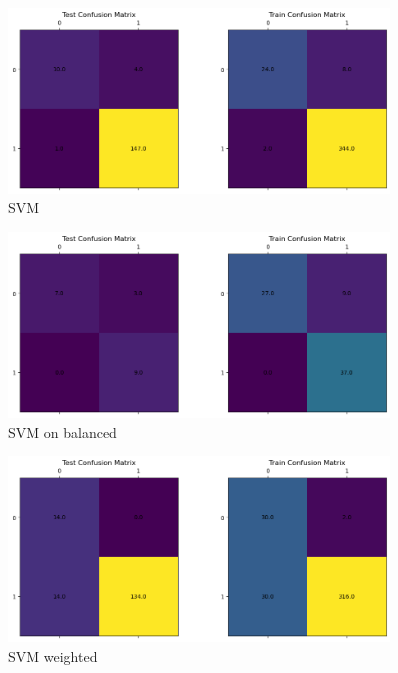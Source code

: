 \documentclass[12pt]{article}
\begin{document}
        \newpage


        \begin{figure}[h!]
            \centering
            \includegraphics[width=0.9\textwidth]{resources/conf_svm.png}
            \caption{SVM}
            \label{fig:conf_svm}
        \end{figure}


        \begin{figure}[h!]
            \centering
            \includegraphics[width=0.9\textwidth]{resources/conf_svm_balanced.png}
            \caption{SVM on balanced}
            \label{fig:conf_svm_on_balanced}
        \end{figure}

        \newpage


        \begin{figure}[h!]
            \centering
            \includegraphics[width=0.9\textwidth]{resources/conf_svm_weighted.png}
            \caption{SVM weighted}
            \label{fig:conf_svm_weighted}
        \end{figure}
\end{document}
